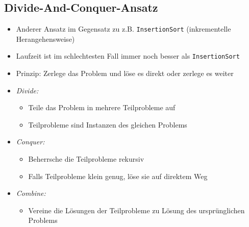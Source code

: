 \subsection{Divide-And-Conquer-Ansatz}
    \begin{itemize}
        \item Anderer Ansatz im Gegensatz zu z.B. \texttt{InsertionSort} (inkrementelle Herangehensweise)
        \item Laufzeit ist im schlechtesten Fall immer noch besser als \texttt{InsertionSort}
        \item Prinzip: Zerlege das Problem und löse es direkt oder zerlege es weiter
        \item \textit{Divide:} 
            \begin{itemize}
                \item Teile das Problem in mehrere Teilprobleme auf
                \item Teilprobleme sind Instanzen des gleichen Problems 
            \end{itemize}
        \item \textit{Conquer:} 
            \begin{itemize}
                \item Beherrsche die Teilprobleme rekursiv
                \item Falls Teilprobleme klein genug, löse sie auf direktem Weg
            \end{itemize}
        \item \textit{Combine:}
            \begin{itemize}
                \item Vereine die Lösungen der Teilprobleme zu Lösung des ursprünglichen Problems
            \end{itemize}
    \end{itemize}

